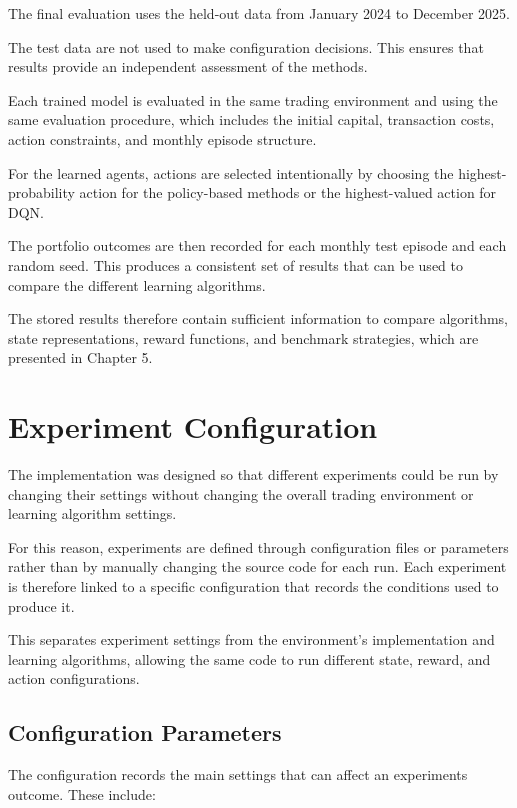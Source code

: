 The final evaluation uses the held-out data from January 2024 to
December 2025.

The test data are not used to make configuration decisions. This ensures
that results provide an independent assessment of the methods.

Each trained model is evaluated in the same trading environment and
using the same evaluation procedure, which includes the initial capital,
transaction costs, action constraints, and monthly episode structure.

For the learned agents, actions are selected intentionally by choosing
the highest-probability action for the policy-based methods or the
highest-valued action for DQN.

The portfolio outcomes are then recorded for each monthly test episode
and each random seed. This produces a consistent set of results that can
be used to compare the different learning algorithms.

The stored results therefore contain sufficient information to compare
algorithms, state representations, reward functions, and benchmark
strategies, which are presented in Chapter 5.

\section{Experiment Configuration}

The implementation was designed so that different experiments could be
run by changing their settings without changing the overall trading
environment or learning algorithm settings.

For this reason, experiments are defined through configuration files or
parameters rather than by manually changing the source code for each
run. Each experiment is therefore linked to a specific configuration
that records the conditions used to produce it.

This separates experiment settings from the environment's implementation
and learning algorithms, allowing the same code to run different state,
reward, and action configurations.

\subsection{Configuration Parameters}

The configuration records the main settings that can affect an
experiment\textquotesingle s outcome. These include:

